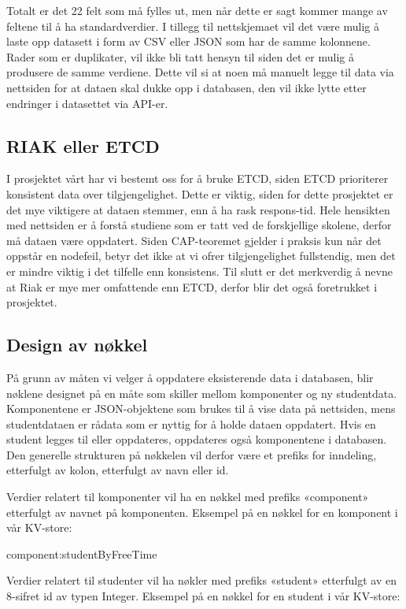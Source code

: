 Totalt er det 22 felt som må fylles ut, men når dette er sagt kommer mange av feltene til å ha standardverdier. I tillegg til nettskjemaet vil det være mulig å laste opp datasett i form av CSV eller JSON som har de samme kolonnene. Rader som er duplikater, vil ikke bli tatt hensyn til siden det er mulig å produsere de samme verdiene. Dette vil si at noen må manuelt legge til data via nettsiden for at dataen skal dukke opp i databasen, den vil ikke lytte etter endringer i datasettet via API-er.

\subsection{RIAK eller ETCD}
I prosjektet vårt har vi bestemt oss for å bruke ETCD, siden ETCD prioriterer konsistent data over tilgjengelighet. Dette er viktig, siden for dette prosjektet er det mye viktigere at dataen stemmer, enn å ha rask respons-tid. Hele hensikten med nettsiden er å forstå studiene som er tatt ved de forskjellige skolene, derfor må dataen være oppdatert. Siden CAP-teoremet gjelder i praksis kun når det oppstår en nodefeil, betyr det ikke at vi ofrer tilgjengelighet fullstendig, men det er mindre viktig i det tilfelle enn konsistens. Til slutt er det merkverdig å nevne at Riak er mye mer omfattende enn ETCD, derfor blir det også foretrukket i prosjektet.

\subsection{Design av nøkkel}
På grunn av måten vi velger å oppdatere eksisterende data i databasen, blir nøklene designet på en måte som skiller mellom komponenter og ny studentdata. Komponentene er JSON-objektene som brukes til å vise data på nettsiden, mens studentdataen er rådata som er nyttig for å holde dataen oppdatert. Hvis en student legges til eller oppdateres, oppdateres også komponentene i databasen. Den generelle strukturen på nøkkelen vil derfor være et prefiks for inndeling, etterfulgt av kolon, etterfulgt av navn eller id.

Verdier relatert til komponenter vil ha en nøkkel med prefiks «component» etterfulgt av navnet på komponenten. Eksempel på en nøkkel for en komponent i vår KV-store:

  component:studentByFreeTime

Verdier relatert til studenter vil ha nøkler med prefiks «student» etterfulgt av en 8-sifret id av typen Integer. Eksempel på en nøkkel for en student i vår KV-store:

